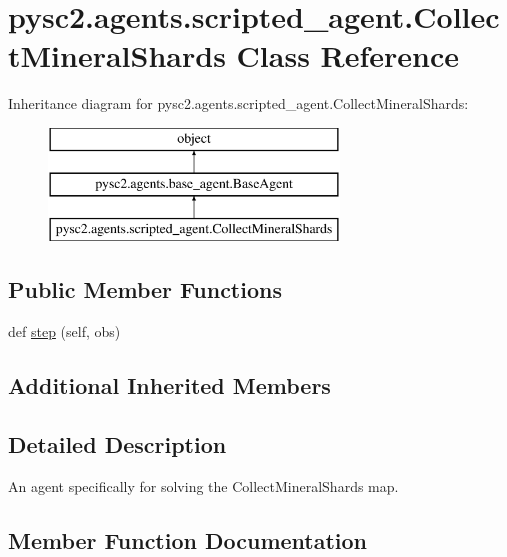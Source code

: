 \hypertarget{classpysc2_1_1agents_1_1scripted__agent_1_1_collect_mineral_shards}{}\section{pysc2.\+agents.\+scripted\+\_\+agent.\+Collect\+Mineral\+Shards Class Reference}
\label{classpysc2_1_1agents_1_1scripted__agent_1_1_collect_mineral_shards}
Inheritance diagram for pysc2.\+agents.\+scripted\+\_\+agent.\+Collect\+Mineral\+Shards\+:\begin{figure}[H]
\begin{center}
\leavevmode
\includegraphics[height=3.000000cm]{classpysc2_1_1agents_1_1scripted__agent_1_1_collect_mineral_shards}
\end{center}
\end{figure}
\subsection*{Public Member Functions}
\begin{DoxyCompactItemize}
\item 
def \mbox{\hyperlink{classpysc2_1_1agents_1_1scripted__agent_1_1_collect_mineral_shards_a74fd157c889f76bb587eb46c3ff83f7e}{step}} (self, obs)
\end{DoxyCompactItemize}
\subsection*{Additional Inherited Members}


\subsection{Detailed Description}
\begin{DoxyVerb}An agent specifically for solving the CollectMineralShards map.\end{DoxyVerb}
 

\subsection{Member Function Documentation}
\mbox{\label{classpysc2_1_1agents_1_1scripted__agent_1_1_collect_mineral_shards_a74fd157c889f76bb587eb46c3ff83f7e}} 

